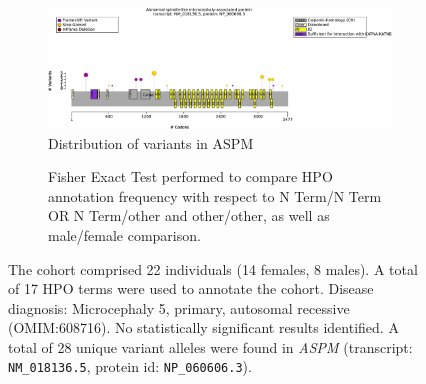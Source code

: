 \begin{figure}[htbp]
\centering
\begin{subfigure}[b]{0.95\textwidth}
\centering
\includegraphics[width=\textwidth]{ img/ASPM_protein_diagram.pdf} 
\captionsetup{justification=raggedright,singlelinecheck=false}
\caption{Distribution of variants in ASPM}
\end{subfigure}

\vspace{2em}

\begin{subfigure}[b]{0.95\textwidth}
\centering
{}
\captionsetup{justification=raggedright,singlelinecheck=false}
\caption{Fisher Exact Test performed to compare HPO annotation frequency with respect to N Term/N Term OR N Term/other and other/other, as well as male/female comparison. }
\end{subfigure}

\vspace{2em}

\caption{ The cohort comprised 22 individuals (14 females, 8 males). A total of 17 HPO terms were used to annotate the cohort. Disease diagnosis: Microcephaly 5, primary, autosomal recessive (OMIM:608716). No statistically significant results identified. A total of 28 unique variant alleles were found in \textit{ASPM} (transcript: \texttt{NM\_018136.5}, protein id: \texttt{NP\_060606.3}).}
\end{figure}
